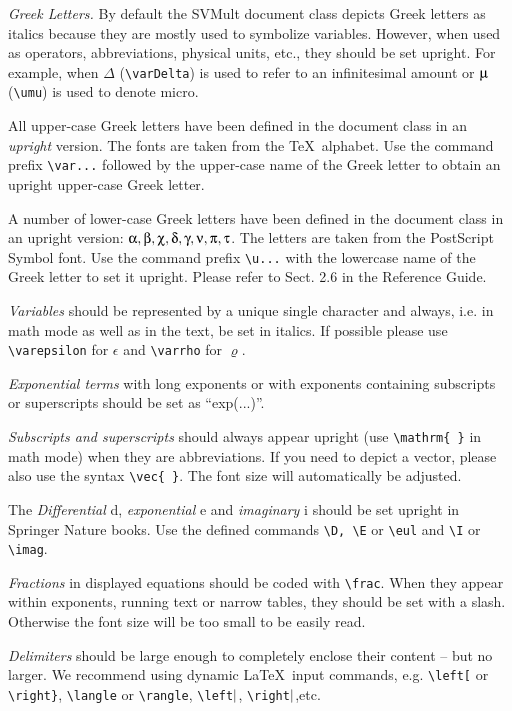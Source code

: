 \documentclass[graybox]{svmult}
\begin{document}
\begin{refguide}
\begin{sloppy}
{\it Greek Letters.} By default the {\sc SVMult} document class depicts Greek letters as italics because they are mostly used to symbolize variables. However, when used as operators, abbreviations, physical units, etc., they should be set upright. For example, when $\varDelta$ (\verb|\varDelta|) is used to refer to an infinitesimal amount or $\umu$ (\verb|\umu|) is used to denote micro.

All upper-case Greek letters have been defined in the document class in an {\it upright} version. The fonts are taken from the \TeX~alphabet. Use the command prefix \verb|\var...| followed by the upper-case name of the Greek letter to obtain an upright upper-case Greek letter.

A number of lower-case Greek letters have been defined in the document class in an upright version: $\ualpha, \ubeta, \uchi, \udelta, \ugamma, \unu, \upi, \utau$. The letters are taken from the PostScript Symbol font. Use the command prefix \verb|\u...| with the lower­case name of the Greek letter to set it upright. Please refer to Sect. 2.6 in the Reference Guide.

{\it Variables} should be represented by a unique single character and always, i.e. in math mode as well as in the text, be set in italics. If possible please use \verb|\varepsilon| for $\epsilon$ and \verb|\varrho| for $\varrho$.

{\it Exponential terms} with long exponents or with exponents containing subscripts or superscripts should be set as ``exp(...)''.

{\it Subscripts and superscripts} should always appear upright (use \verb|\mathrm{ }| in math mode) when they are abbreviations. If you need to depict a vector, please also use the syntax \verb|\vec{ }|. The font size will automatically be adjusted.

The {\it Differential} d, {\it exponential} e and {\it imaginary} i should be set upright in Springer Nature books. Use the defined commands \verb|\D, \E| or \verb|\eul| and \verb|\I| or \verb|\imag|.

{\it Fractions} in displayed equations should be coded with \verb|\frac|. When they appear within exponents, running text or narrow tables, they should be set with a slash. Otherwise the font size will be too small to be easily read.

{\it Delimiters} should be large enough to completely enclose their content -- but no larger. We recommend using dynamic \LaTeX~input commands, e.g. \verb|\left[| or \verb|\right}|, \verb|\langle| or \verb|\rangle|, \verb|\left|${\tt \vert}$, \verb|\right|${\tt \vert}$,etc.



\end{sloppy}
\end{refguide}
\end{document}
